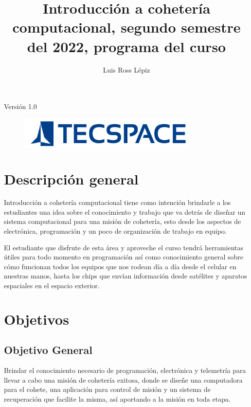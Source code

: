 ﻿\documentclass[letterpaper]{article}
\title{Introducción a cohetería computacional, segundo semestre del 2022, programa del curso}
\author{Luis Ross Lépiz}
\begin{document}
\maketitle
\thispagestyle{empty}
\begin{center}
    Versión 1.0
\end{center}

\begin{figure}[b]
    \centering
    \includegraphics[width=0.8\textwidth]{img/logo.png}
\end{figure}
\clearpage

\tableofcontents
\clearpage

\section{Descripción general}
Introducción a cohetería computacional tiene como intención brindarle a los estudiantes una idea
sobre el conocimiento y trabajo que va detrás de diseñar un sistema computacional para una misión de
cohetería, esto desde los aspectos de electrónica, programación y un poco de organización de trabajo
en equipo.

El estudiante que disfrute de esta área y aproveche el curso tendrá herramientas útiles para todo
momento en programación así como conocimiento general sobre cómo funcionan todos los equipos que nos
rodean día a día desde el celular en nuestras manos, hasta los chips que envían información desde
satélites y aparatos espaciales en el espacio exterior.

\section{Objetivos}
\subsection{Objetivo General}
Brindar el conocimiento necesario de programación, electrónica y telemetría para llevar a cabo una
misión de cohetería exitosa, donde se diseñe una computadora para el cohete, una aplicación para
control de misión y un sistema de recuperación que facilite la misma, así aportando a la misión en
toda etapa.
\end{document}
